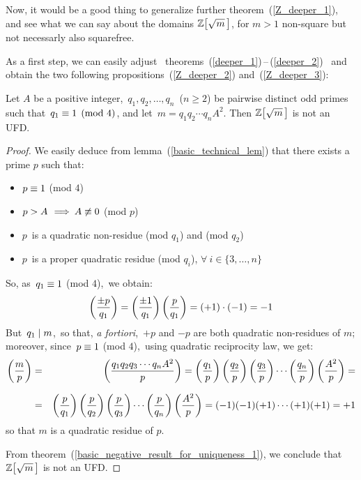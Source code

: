 \smallskip
Now, it would be a good thing to generalize further
theorem~(\ref{Z_deeper_1}), and see what we can say
about the domains $\ZZ{m}$, for $m > 1$ non-square but
not necessarly also squarefree.

As a first step, we can easily adjust \mbox{%
theorems (\ref{deeper_1})\,--\,(\ref{deeper_2})%
} and obtain the two following propositions~(\ref{Z_deeper_2})
and~(\ref{Z_deeper_3}):

\begin{thm}\label{Z_deeper_2}
Let $A$ be a positive integer,\, $q_1, q_2, \ldots, q_n$\,
($n \geq 2$) be pairwise distinct odd primes such that\,
$q_1 \equiv 1 \pmod 4$, and let\,
$m = q_1 q_2 \cdots q_n A^2$.
Then $\ZZ{m}$ is not an UFD.
\end{thm}

\begin{proof}
%
We easily deduce from lemma~(\ref{basic_technical_lem})
that there exists a prime $p$ such that:

\begin{itemize}

\item $p \equiv 1$ (mod $4$)

\item $p > A\, \:\Longrightarrow\: A \not\equiv 0$ (mod $p$)

\item $p$\, is a quadratic non-residue
(mod $q_1$) and (mod $q_2$)

\item $p$\, is a proper quadratic residue (mod $q_i$),
$\forall\: i \in \{3, \ldots, n\}$

\end{itemize}

So, as\, $q_1 \equiv 1$ (mod $4$),\, we obtain:
$$
  \left(\frac{\pm{p}}{q_1}\right) = \left(\frac{\pm{1}}{q_1}\right)\left(\frac{p}{q_1}\right)
  = (+1) \cdot (-1) = -1
$$
But \,$q_1 \mid m$,\, so that,
\emph{a fortiori},\, $+p$ and $-p$ are both
quadratic non-residues of $m$;\, moreover, since\,
$p \equiv 1$ (mod $4$),\, using quadratic
reciprocity law, we get:
%
{\setlength\arraycolsep{2pt}
\begin{eqnarray*}
\left(\frac{m}{p}\right) & = &\left(\frac{q_1 q_2 q_3 \cdots q_n A^2}{p}\right)
= \left(\frac{q_1}{p}\right) \left(\frac{q_2}{p}\right) \left(\frac{q_3}{p}\right) \cdots
\left(\frac{q_n}{p}\right) \left(\frac{A^2}{p}\right) = \\[7pt]
& = & \left(\frac{p}{q_1}\right) \left(\frac{p}{q_2}\right) \left(\frac{p}{q_3}\right) \cdots
\left(\frac{p}{q_n}\right) \left(\frac{A^2}{p}\right) = 
(-1) (-1) (+1) \cdots (+1) (+1) = +1
\end{eqnarray*}}
\!\!so that $m$ is a quadratic residue of $p$.

From theorem~(\ref{basic_negative_result_for_uniqueness_1}),
we conclude that $\ZZ{m}$ is not an UFD.
%
\end{proof}


